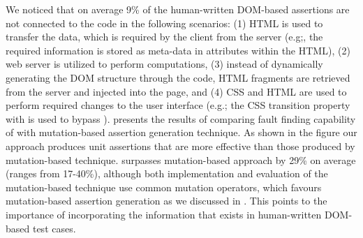 We noticed that on average 9\% of the human-written DOM-based assertions are not connected to the \javascript code in the following scenarios: (1) HTML is used to transfer the data, which is required by the client from the server (e.g;, the required information is stored as meta-data in attributes within the HTML), (2) web server is utilized to perform computations, (3) instead of dynamically generating the DOM structure through the \javascript code, HTML fragments are retrieved from the server and injected into the page, and (4) CSS and HTML are used to perform required changes to the user interface (e.g.; the CSS transition property with  is used to bypass \javascript).
 presents the results of comparing fault finding capability of \tool with mutation-based assertion generation technique. As shown in the figure our approach produces unit assertions that are more effective than those produced by mutation-based technique. \tool surpasses mutation-based approach by 29\% on average (ranges from 17-40\%), although both implementation and evaluation of the mutation-based technique use common mutation operators, which favours mutation-based assertion generation as we discussed in . This points to the importance of incorporating the information that exists in human-written DOM-based test cases.       


